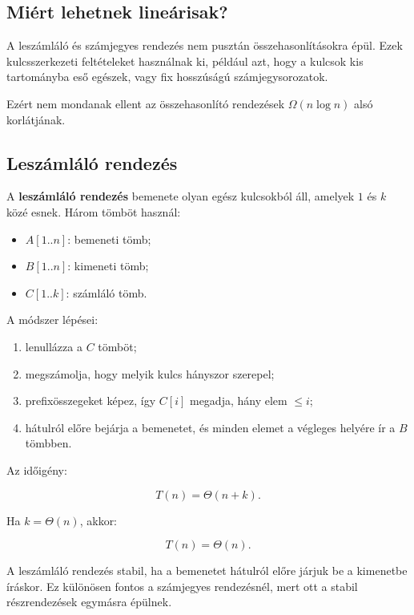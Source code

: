 \subsection{Miért lehetnek lineárisak?}

A leszámláló és számjegyes rendezés nem pusztán összehasonlításokra épül. Ezek kulcsszerkezeti feltételeket használnak ki, például azt, hogy a kulcsok kis tartományba eső egészek, vagy fix hosszúságú számjegysorozatok.

Ezért nem mondanak ellent az összehasonlító rendezések $\Omega(n\log n)$ alsó korlátjának.



\subsection{Leszámláló rendezés}

A \textbf{leszámláló rendezés} bemenete olyan egész kulcsokból áll, amelyek $1$ és $k$ közé esnek. Három tömböt használ:

\begin{itemize}
  \item $A[1..n]$: bemeneti tömb;
  \item $B[1..n]$: kimeneti tömb;
  \item $C[1..k]$: számláló tömb.
\end{itemize}

A módszer lépései:

\begin{enumerate}
  \item lenullázza a $C$ tömböt;
  \item megszámolja, hogy melyik kulcs hányszor szerepel;
  \item prefixösszegeket képez, így $C[i]$ megadja, hány elem $\leq i$;
  \item hátulról előre bejárja a bemenetet, és minden elemet a végleges helyére ír a $B$ tömbben.
\end{enumerate}


Az időigény:

\[
T(n)=\Theta(n+k).
\]

Ha $k=\Theta(n)$, akkor:

\[
T(n)=\Theta(n).
\]

A leszámláló rendezés stabil, ha a bemenetet hátulról előre járjuk be a kimenetbe íráskor. Ez különösen fontos a számjegyes rendezésnél, mert ott a stabil részrendezések egymásra épülnek.

